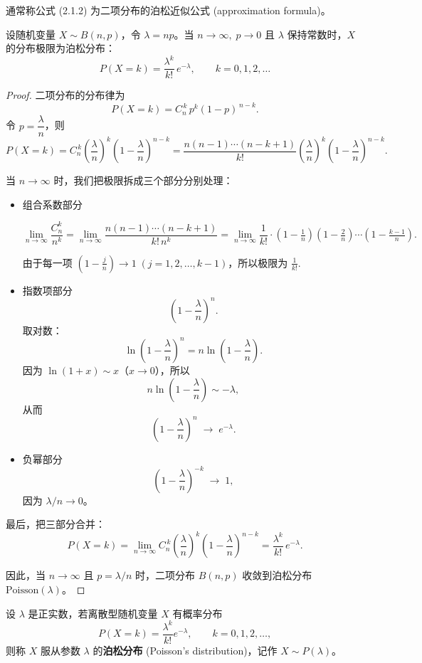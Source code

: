 通常称公式 (2.1.2) 为二项分布的泊松近似公式 (approximation formula)。
\begin{proposition}[泊松分布由二项分布极限得到]
设随机变量 $X \sim B(n,p)$，令 $\lambda = np$。当 $n \to \infty,\; p \to 0$ 且 $\lambda$ 保持常数时，$X$ 的分布极限为泊松分布：
\[
P(X=k)=\frac{\lambda^{k}}{k!}\,e^{-\lambda}, \qquad k=0,1,2,\dots
\]
\end{proposition}
\begin{proof}
二项分布的分布律为
\[
P(X=k)=C_{n}^{\,k}\,p^{k}(1-p)^{\,n-k}.
\]
令 $p=\dfrac{\lambda}{n}$，则
\[
P(X=k)
= C_{n}^{\,k}\left(\frac{\lambda}{n}\right)^{k}\!\left(1-\frac{\lambda}{n}\right)^{n-k}
= \frac{n(n-1)\cdots(n-k+1)}{k!}\left(\frac{\lambda}{n}\right)^{k}\!\left(1-\frac{\lambda}{n}\right)^{n-k}.
\]

当 $n\to\infty$ 时，我们把极限拆成三个部分分别处理：

\begin{itemize}
 \item 组合系数部分


\[
\lim_{n \to \infty} \frac{C_n^k}{n^k} 
= \lim_{n \to \infty} \frac{n (n-1) \cdots (n-k+1)}{k! \, n^k}
= \lim_{n \to \infty} \frac{1}{k!} \cdot 
\left(1 - \tfrac{1}{n}\right)
\left(1 - \tfrac{2}{n}\right) 
\cdots 
\left(1 - \tfrac{k-1}{n}\right).
\]

由于每一项 $\left(1 - \tfrac{j}{n}\right) \to 1 \;(j=1,2,\dots,k-1)$，所以极限为
$
\frac{1}{k!}.
$

  \item 指数项部分
  \[
  \left(1-\frac{\lambda}{n}\right)^n.
  \]
  取对数：
  \[
  \ln\!\left(1-\frac{\lambda}{n}\right)^n = n \ln\!\left(1-\frac{\lambda}{n}\right).
  \]
  因为 $\ln(1+x)\sim x$（$x\to 0$），所以
  \[
  n \ln\!\left(1-\frac{\lambda}{n}\right) \sim -\lambda,
  \]
  从而
  \[
  \left(1-\frac{\lambda}{n}\right)^n \;\longrightarrow\; e^{-\lambda}.
  \]

  \item 负幂部分
  \[
  \left(1-\frac{\lambda}{n}\right)^{-k} \;\longrightarrow\; 1,
  \]
  因为 $\lambda/n \to 0$。
\end{itemize}

最后，把三部分合并：
\[
P(X=k)
=\lim_{n\to\infty} C_{n}^{\,k}\left(\frac{\lambda}{n}\right)^{k}\!\left(1-\frac{\lambda}{n}\right)^{n-k}
=\frac{\lambda^{k}}{k!}\,e^{-\lambda}.
\]

因此，当 $n\to\infty$ 且 $p=\lambda/n$ 时，二项分布 $B(n,p)$ 收敛到泊松分布 $\text{Poisson}(\lambda)$。
\end{proof}
\begin{definition}[泊松分布]
设 $\lambda$ 是正实数，若离散型随机变量 $X$ 有概率分布
\[
P(X=k)=\frac{\lambda^k}{k!}e^{-\lambda}, \qquad k=0,1,2,\dots, \tag{2.1.3}
\]
则称 $X$ 服从参数 $\lambda$ 的\textbf{泊松分布} (Poisson's distribution)，记作 $X\sim P(\lambda)$。
\end{definition}
